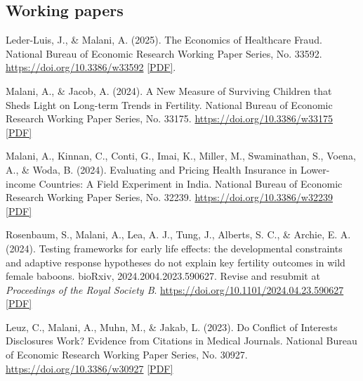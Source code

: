     \subsection*{Working papers}

    \begin{tablist}

        \item[2025] \tab{}Leder-Luis, J., \& Malani, A. (2025). The Economics of Healthcare Fraud. National Bureau of Economic Research Working Paper Series, No. 33592. \href{https://doi.org/10.3386/w33592}{https://doi.org/10.3386/w33592} \href{https://github.com/anup-malani/website_personal/blob/main/publications/2025_LederLuisMalani_NBER33592_HealthcareFraud.pdf}{[PDF]}.
                
\item[2024] \tab{}Malani, A., \& Jacob, A. (2024). A New Measure of Surviving Children that Sheds Light on Long-term Trends in Fertility. National Bureau of Economic Research Working Paper Series, No. 33175. \href{https://doi.org/10.3386/w33175}{https://doi.org/10.3386/w33175} \href{https://github.com/anup-malani/website_personal/blob/main/publications/2024_Malani_NBERw33175_SurvivingChildren.pdf}{[PDF]}
        
        \item[2024] \tab{}Malani, A., Kinnan, C., Conti, G., Imai, K., Miller, M., Swaminathan, S., Voena, A., \& Woda, B. (2024). Evaluating and Pricing Health Insurance in Lower-income Countries: A Field Experiment in India. National Bureau of Economic Research Working Paper Series, No. 32239. \href{https://doi.org/10.3386/w32239}{https://doi.org/10.3386/w32239} \href{https://github.com/anup-malani/website_personal/blob/main/publications/2024_Malani_NBERw32239_PricingHealthInsuranceIndia.pdf}{[PDF]} 
        
        \item[2024] \tab{}Rosenbaum, S., Malani, A., Lea, A. J., Tung, J., Alberts, S. C., \& Archie, E. A. (2024). Testing frameworks for early life effects: the developmental constraints and adaptive response hypotheses do not explain key fertility outcomes in wild female baboons. bioRxiv, 2024.2004.2023.590627. Revise and resubmit at \textit{Proceedings of the Royal Society B}.  \href{https://doi.org/10.1101/2024.04.23.590627}{https://doi.org/10.1101/2024.04.23.590627} \href{https://github.com/anup-malani/website_personal/blob/main/publications/2024_RosenbaumMalani_Biorxiv_EarlyLife.pdf}{[PDF]} 

        \item[2023] \tab{}Leuz, C., Malani, A., Muhn, M., \& Jakab, L. (2023). Do Conflict of Interests Disclosures Work? Evidence from Citations in Medical Journals. National Bureau of Economic Research Working Paper Series, No. 30927. \href{https://doi.org/10.3386/w30927}{https://doi.org/10.3386/w30927} \href{https://github.com/anup-malani/website_personal/blob/main/publications/2023_LeuzMalani_NBERw30927_COIDisclosuresMedicine.pdf}{[PDF]}


\end{tablist}
